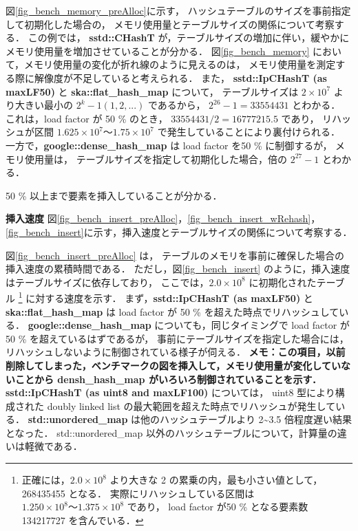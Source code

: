 図\ref{fig_bench_memory_preAlloc}に示す，
ハッシュテーブルのサイズを事前指定して初期化した場合の，
メモリ使用量とテーブルサイズの関係について考察する．
この例では，
{\bf sstd::CHashT} が，テーブルサイズの増加に伴い，緩やかにメモリ使用量を増加させていることが分かる．
図\ref{fig_bench_memory} において，メモリ使用量の変化が折れ線のように見えるのは，
メモリ使用量を測定する際に解像度が不足していると考えられる．
また，
{\bf sstd::IpCHashT (as maxLF50)} と {\bf ska::flat\_hash\_map} について，
テーブルサイズは $2\times10^7$ より大きい最小の $2^k-1 (1,2,...)$ であるから，
$2^{26}-1 = 33554431$ とわかる．
これは，load factor が 50 \% のとき，
$33554431/2=16777215.5$ であり，
リハッシュが区間 $1.625\times10^7〜1.75\times10^7$ で発生していることにより裏付けられる．
一方で，{\bf google::dense\_hash\_map} は load factor を50 \% に制御するが，
メモリ使用量は，
テーブルサイズを指定して初期化した場合，倍の $2^{27}-1$ とわかる．

50 \% 以上まで要素を挿入していることが分かる．
\leavevmode \newline

%
{\bf 挿入速度}
\samepage\newline\indent
図\ref{fig_bench_insert_preAlloc}，\ref{fig_bench_insert_wRehash}，\ref{fig_bench_insert}に示す，挿入速度とテーブルサイズの関係について考察する．

図\ref{fig_bench_insert_preAlloc} は，
テーブルのメモリを事前に確保した場合の挿入速度の累積時間である．
ただし，図\ref{fig_bench_insert} のように，挿入速度はテーブルサイズに依存しており，
ここでは，$2.0\times10^8$ に初期化されたテーブル
\footnote{
  正確には，$2.0\times10^8$ より大きな 2 の累乗の内，最も小さい値として，268435455 となる．
  実際にリハッシュしている区間は $1.250\times10^8〜1.375\times10^8$ であり，
  load factor が50 \% となる要素数 134217727 を含んでいる．
}
に対する速度を示す．
まず，{\bf sstd::IpCHashT (as maxLF50)} と {\bf ska::flat\_hash\_map} は load factor が 50 \% を超えた時点でリハッシュしている．
{\bf google::dense\_hash\_map} についても，同じタイミングで load factor が 50 \% を超えているはずであるが，
事前にテーブルサイズを指定した場合には，リハッシュしないように制御されている様子が伺える．
{\bf \color{red}メモ：この項目，以前削除してしまった，ベンチマークの図を挿入して，メモリ使用量が変化していないことから densh\_hash\_map がいろいろ制御されていることを示す．}
{\bf sstd::IpCHashT (as uint8 and maxLF100)} については，
uint8 型により構成された doubly linked list の最大範囲を超えた時点でリハッシュが発生している．
{\bf std::unordered\_map} は他のハッシュテーブルより 2\textasciitilde 3.5 倍程度遅い結果となった．
std::unordered\_map 以外のハッシュテーブルについて，計算量の違いは軽微である．

